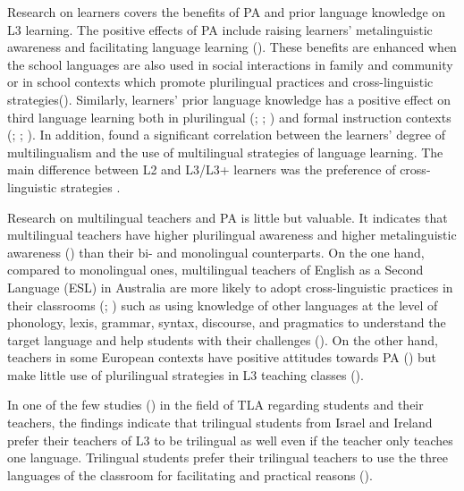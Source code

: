 \documentclass[output=paper]{../langscibook}
\begin{document}
Research on learners covers the benefits of PA and prior language knowledge on L3 learning. The positive effects of PA include raising learners’ metalinguistic awareness \citep{JessnerEtAl2016} and facilitating language learning (\citealt{BonoStratilaki2009}). These benefits are enhanced when the school languages are also used in social interactions in family and community or in school contexts which promote plurilingual practices and cross-linguistic strategies\linebreak (\citealt{BonoStratilaki2009}). Similarly, learners’ prior language knowledge has a positive effect on third language learning both in plurilingual (\citealt{BonoStratilaki2009}; \citealt{Cenoz2013b}; \citealt{Sanchez2015}) and formal instruction contexts (\citealt{Kemp2001}; \citealt{GibsonHufeisen2003};  \citealt{DeAngelis2007}). In addition, \citet{Dmitrenko2017} found a significant correlation between the learners’ degree of multilingualism and the use of multilingual strategies of language learning. The main difference between L2 and L3/L3+ learners was the preference of cross-linguistic strategies \citep{Dmitrenko2017}.

Research on multilingual teachers and PA is little but valuable. It indicates that multilingual teachers have higher plurilingual awareness \citep{Otwinowska2014} and higher metalinguistic awareness (\citealt{Ellis2004,Ellis2013}) than their bi- and monolingual counterparts. On the one hand, compared to monolingual ones, multilingual teachers of English as a Second Language (ESL) in Australia are more likely to adopt cross-linguistic practices in their classrooms (\citealt{Ellis2004,Ellis2013}; \citealt{HigginsPonte2017}) such as using knowledge of other languages at the level of phonology, lexis, grammar, syntax, discourse, and pragmatics to understand the target language and help students with their challenges (\citealt{Ellis2004,Ellis2013}). On the other hand, teachers in some European contexts have positive attitudes towards PA (\citealt{GrivaEtAl2016}) but make little use of plurilingual strategies in L3 teaching classes (\citealt{GöbelVieluf2014}).

In one of the few studies (\citealt{AroninOLaoire2003}) in the field of TLA regarding students and their teachers, the findings indicate that trilingual students from Israel and Ireland prefer their teachers of L3 to be trilingual as well even if the teacher only teaches one language. Trilingual students prefer their trilingual teachers to use the three languages of the classroom for facilitating and practical reasons (\citealt{AroninOLaoire2003}).
\end{document}
